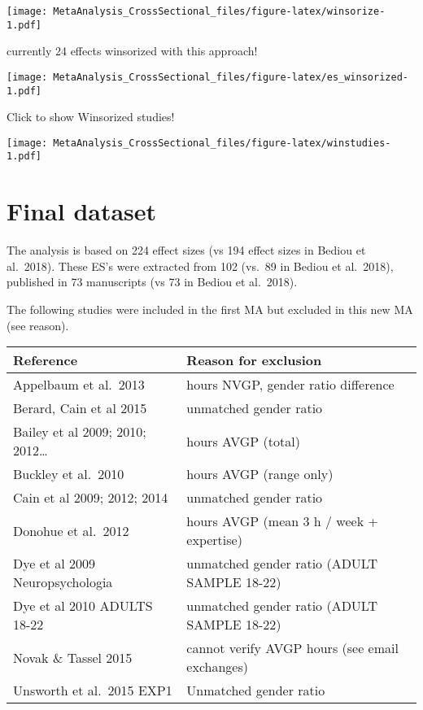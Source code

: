 \documentclass[
]{book}
\begin{document}
\texttt{[image: MetaAnalysis\_CrossSectional\_files/figure-latex/winsorize-1.pdf]}

currently 24 effects winsorized with this approach!

\texttt{[image: MetaAnalysis\_CrossSectional\_files/figure-latex/es\_winsorized-1.pdf]}

Click to show Winsorized studies!

\texttt{[image: MetaAnalysis\_CrossSectional\_files/figure-latex/winstudies-1.pdf]}

\hypertarget{final-dataset}{%
\section{Final dataset}\label{final-dataset}}

The analysis is based on 224 effect sizes (vs 194 effect sizes in Bediou et al.~2018).
These ES's were extracted from 102 (vs.~89 in Bediou et al.~2018),
published in 73 manuscripts (vs 73 in Bediou et al.~2018).

The following studies were included in the first MA but excluded in this new MA (see reason).

\begin{longtable}[]{@{}
  >{\raggedright\arraybackslash}p{}
  >{\raggedright\arraybackslash}p{}@{}}
\toprule
Reference & Reason for exclusion \\
\midrule
\endhead
Appelbaum et al.~2013 & hours NVGP, gender ratio difference \\
Berard, Cain et al 2015 & unmatched gender ratio \\
Bailey et al 2009; 2010; 2012\ldots{} & hours AVGP (total) \\
Buckley et al.~2010 & hours AVGP (range only) \\
Cain et al 2009; 2012; 2014 & unmatched gender ratio \\
Donohue et al.~2012 & hours AVGP (mean 3 h / week + expertise) \\
Dye et al 2009 Neuropsychologia & unmatched gender ratio (ADULT SAMPLE 18-22) \\
Dye et al 2010 ADULTS 18-22 & unmatched gender ratio (ADULT SAMPLE 18-22) \\
Novak \& Tassel 2015 & cannot verify AVGP hours (see email exchanges) \\
Unsworth et al.~2015 EXP1 & Unmatched gender ratio \\
\bottomrule
\end{longtable}
\end{document}
